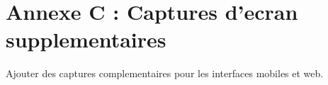\chapter{Annexe C : Captures d'ecran supplementaires}

Ajouter des captures complementaires pour les interfaces mobiles et web.
